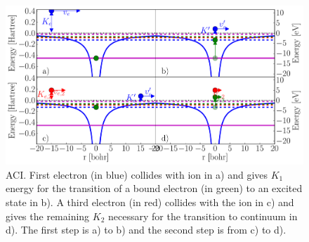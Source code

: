 \begin{figure}
 \centering
 \includegraphics[width=\figurewidth]{figures/ionization_aci}
 \caption{ACI. First electron (in blue) collides with ion in a) and gives
          $K_1$ energy for the transition of a bound electron (in green) to an
          excited state in b).
          A third electron (in red) collides with the ion in c) and
          gives the remaining $K_2$ necessary for the transition to continuum
          in d). The first step is a) to b) and the second step is from c) to d).}
 \label{fig:ionization:aci}
\end{figure}









